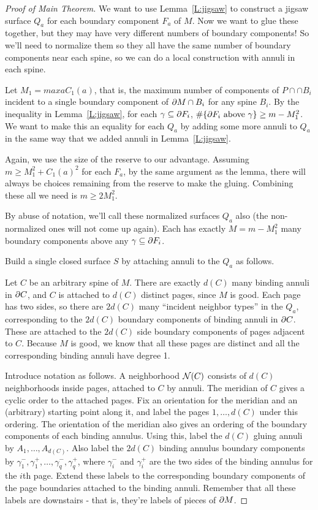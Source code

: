 \begin{proof}[Proof of Main Theorem]

We want to use Lemma~\ref{L:jigsaw} to construct a jigsaw surface
$Q_a$ for each boundary component $F_a$ of $M$. Now we want to glue these
together, but they may have very different numbers of boundary components! So
we'll need to normalize them so they all have the same number of boundary
components near each spine, so we can do a local construction with annuli in
each spine.

Let $M_1 = max a C_1(a)$, that is, the maximum number of components of $P \cap
\cap B_i$ incident to a single boundary component of $\partial M \cap B_i$ for any
spine $B_i$. By the inequality in Lemma~\ref{L:jigsaw}, for each $\gamma \subseteq
\partial F_i$, $\#\{\partial F_i \text{ above } \gamma\} \geq m - M_1^2$. We want to make
this an equality for each $Q_a$ by adding some more annuli to $Q_a$ in the same
way that we added annuli in Lemma~\ref{L:jigsaw}.

Again, we use the size of the reserve to our advantage. Assuming $m\geq M_1^2
+ C_1(a)^2$ for each $F_a$, by the same argument as the lemma, there will
always be choices remaining from the reserve to make the gluing. Combining
these all we need is $m\geq 2M_1^2$.

By abuse of notation, we'll call these normalized surfaces $Q_a$ also (the
non-normalized ones will not come up again). Each has exactly $M = m - M_1^2$
many boundary components above any $\gamma \subseteq \partial F_i$.

Build a single closed surface $S$ by attaching annuli to the $Q_a$ as follows.

Let $C$ be an arbitrary spine of $M$. There are exactly $d(C)$ many binding
annuli in $\partial C$, and $C$ is attached to $d(C)$ distinct pages, since $M$ is
good. Each page has two sides, so there are $2d(C)$ many ``incident neighbor
types'' in the $Q_a$, corresponding to the $2d(C)$ boundary components of
binding annuli in $\partial C$. These are attached to the $2d(C)$ side boundary
components of pages adjacent to $C$.  Because $M$ is good, we know that all
these pages are distinct and all the corresponding binding annuli have degree
1.

Introduce notation as follows. A neighborhood $\mathcal{N}(C)$ consists of $d(C)$
neighborhoods inside pages, attached to $C$ by annuli. The meridian of $C$
gives a cyclic order to the attached pages.  Fix an orientation for the
meridian and an (arbitrary) starting point along it, and label the pages $1,
\dots, d(C)$ under this ordering.  The orientation of the meridian also gives
an ordering of the boundary components of each binding  annulus.  Using this,
label the $d(C)$ gluing annuli by $A_1,\dots,A_{d(C)}$. Also label the $2d(C)$
binding annulus boundary components by $\gamma_1^-,\gamma_1^+,\dots,
\gamma_q^-,\gamma_q^+$, where $\gamma_i^-$ and $\gamma_i^+$ are the two sides
of the binding annulus for the $i$th page.  Extend these labels to the
corresponding boundary components of the page boundaries attached to the
binding annuli.  Remember that all these labels are downstairs - that is,
they're labels of pieces of $\partial M$.


\end{proof}
